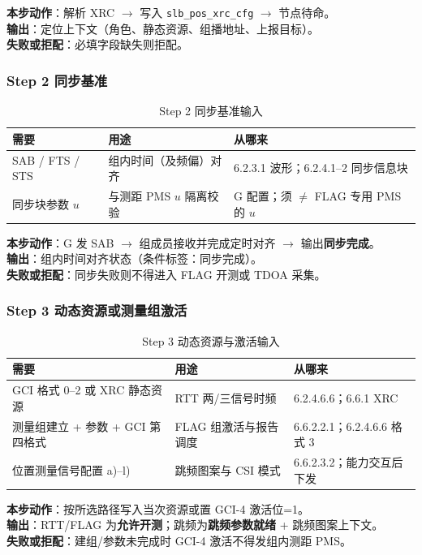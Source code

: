 \documentclass[11pt,a4paper]{ctexart}
\begin{document}
\textbf{本步动作}：解析 XRC $\rightarrow$ 写入 \texttt{slb\_pos\_xrc\_cfg} $\rightarrow$ 节点待命。\\
\textbf{输出}：定位上下文（角色、静态资源、组播地址、上报目标）。\\
\textbf{失败或拒配}：必填字段缺失则拒配。

\subsubsection{Step 2 同步基准}


\begin{longtable}{L{3.4cm}L{4.8cm}L{4.8cm}}
\caption{Step 2 同步基准输入\label{tab:step2-in}} \\
\toprule
\textbf{需要} & \textbf{用途} & \textbf{从哪来} \\
\midrule
SAB / FTS / STS & 组内时间（及频偏）对齐 & 6.2.3.1 波形；6.2.4.1--2 同步信息块 \\
同步块参数 $u$ & 与测距 PMS $u$ 隔离校验 & G 配置；须 $\neq$ FLAG 专用 PMS 的 $u$ \\
\bottomrule
\end{longtable}

\textbf{本步动作}：G 发 SAB $\rightarrow$ 组成员接收并完成定时对齐 $\rightarrow$ 输出\textbf{同步完成}。\\
\textbf{输出}：组内时间对齐状态（条件标签：同步完成）。\\
\textbf{失败或拒配}：同步失败则不得进入 FLAG 开测或 TDOA 采集。

\subsubsection{Step 3 动态资源或测量组激活}


\begin{longtable}{L{3.4cm}L{4.8cm}L{4.8cm}}
\caption{Step 3 动态资源与激活输入\label{tab:step3-in}} \\
\toprule
\textbf{需要} & \textbf{用途} & \textbf{从哪来} \\
\midrule
GCI 格式 0--2 或 XRC 静态资源 & RTT 两/三信号时频 & 6.2.4.6.6；6.6.1 XRC \\
测量组建立 + 参数 + GCI 第四格式 & FLAG 组激活与报告调度 & 6.6.2.2.1；6.2.4.6.6 格式 3 \\
位置测量信号配置 a)--l) & 跳频图案与 CSI 模式 & 6.6.2.3.2；能力交互后下发 \\
\bottomrule
\end{longtable}

\textbf{本步动作}：按所选路径写入当次资源或置 GCI-4 激活位=1。\\
\textbf{输出}：RTT/FLAG 为\textbf{允许开测}；跳频为\textbf{跳频参数就绪} + 跳频图案上下文。\\
\textbf{失败或拒配}：建组/参数未完成时 GCI-4 激活不得发组内测距 PMS。
\end{document}
